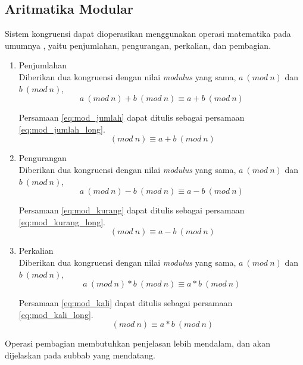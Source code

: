 \subsection{Aritmatika Modular}
Sistem kongruensi dapat dioperasikan menggunakan operasi matematika pada umumnya \cite{stallings_cryptography}, yaitu penjumlahan, pengurangan, perkalian, dan pembagian.
\begin{enumerate}
\item Penjumlahan \\
Diberikan dua kongruensi dengan nilai \textit{modulus} yang sama, $a\ (mod\ n)$ dan $b\ (mod\ n)$,
\begin{equation}
a\ (mod\ n)+b\ (mod\ n)\equiv a+b\ (mod\ n)
\label {eq:mod_jumlah}
\end{equation}

Persamaan \eqref{eq:mod_jumlah} dapat ditulis sebagai persamaan \eqref{eq:mod_jumlah_long}.
\begin{equation}
[a\ (mod\ n)+b\ (mod\ n)]\ (mod\ n)\equiv a+b\ (mod\ n)
\label {eq:mod_jumlah_long}
\end{equation}

\item Pengurangan \\
Diberikan dua kongruensi dengan nilai \textit{modulus} yang sama, $a\ (mod\ n)$ dan $b\ (mod\ n)$,
\begin{equation}
a\ (mod\ n)-b\ (mod\ n)\equiv a-b\ (mod\ n)
\label{eq:mod_kurang}
\end{equation}

Persamaan \eqref{eq:mod_kurang} dapat ditulis sebagai persamaan \eqref{eq:mod_kurang_long}.
\begin{equation}
[a\ (mod\ n)-b\ (mod\ n)]\ (mod\ n)\equiv a-b\ (mod\ n)
\label {eq:mod_kurang_long}
\end{equation}

\item Perkalian \\
Diberikan dua kongruensi dengan nilai \textit{modulus} yang sama, $a\ (mod\ n)$ dan $b\ (mod\ n)$,
\begin{equation}
a\ (mod\ n)*b\ (mod\ n)\equiv a*b\ (mod\ n)
\label{eq:mod_kali}
\end{equation}

Persamaan \eqref{eq:mod_kali} dapat ditulis sebagai persamaan \eqref{eq:mod_kali_long}.
\begin{equation}
[a\ (mod\ n)*b\ (mod\ n)]\ (mod\ n)\equiv a*b\ (mod\ n)
\label{eq:mod_kali_long}
\end{equation}

\end{enumerate}
Operasi pembagian membutuhkan penjelasan lebih mendalam, dan akan dijelaskan pada subbab yang mendatang.

